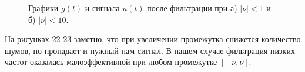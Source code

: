 \documentclass[a5paper, 10pt]{article}
\theoremstyle{definition}
\theoremstyle{plain}
\theoremstyle{remark}
\begin{document}
\begin{figure}[h!]
\begin{minipage}[h]{0.5\linewidth}
\end{minipage}
\hfill
\begin{minipage}[h]{0.5\linewidth}
\end{minipage}
\caption{Графики $g(t)$ и сигнала $u(t)$ после фильтрации при а) $|\nu| < 1$ и б) $|\nu| < 10$.}
\end{figure}

На рисунках 22-23 заметно, что при увеличении промежутка снижется количество шумов, но пропадает и нужный нам сигнал. В нашем случае фильтрация низких частот оказалась малоэффективной при любом промежутке $[-\nu, \nu]$.
\end{document}
